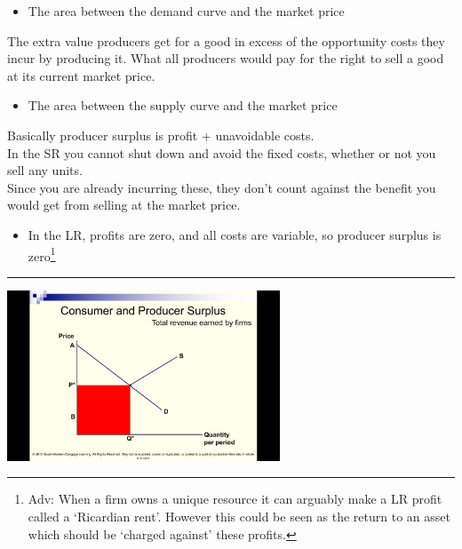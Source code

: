 \documentclass[]{article}
\providecommand{\tightlist}{%
  \setlength{\itemsep}{0pt}\setlength{\parskip}{0pt}}
\begin{document}
\begin{itemize}
\tightlist
\item
  The area between the demand curve and the market price
\end{itemize}

\bigskip

\begin{description}
\tightlist
\item[Producer surplus]
The extra value producers get for a good in excess of the opportunity
costs they incur by producing it. What all producers would pay for the
right to sell a good at its current market price.
\end{description}

\begin{itemize}
\tightlist
\item
  The area between the supply curve and the market price
\end{itemize}

Basically producer surplus is profit + unavoidable costs.\\
In the SR you cannot shut down and avoid the fixed costs, whether or not
you sell any units.\\
Since you are already incurring these, they don't count against the
benefit you would get from selling at the market price.

\begin{itemize}
\tightlist
\item
  In the LR, profits are zero, and all costs are variable, so producer
  surplus is zero\footnote{Adv: When a firm owns a unique resource it
    can arguably make a LR profit called a `Ricardian rent'. However
    this could be seen as the return to an asset which should be
    `charged against' these profits.}
\end{itemize}

\begin{center}\rule{0.5\linewidth}{\linethickness}\end{center}

\includegraphics[height=2in]{picsfigs/prodsurp1.png}
\end{document}
